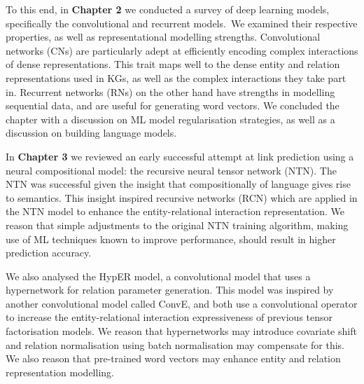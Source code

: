\noindent To this end, in \textbf{Chapter 2} we conducted a survey of deep learning models, specifically the convolutional and recurrent models.\ We examined their respective properties, as well as representational modelling strengths. Convolutional networks (CNs) are particularly adept at efficiently encoding complex interactions of dense representations. This trait maps well to the dense entity and relation representations used in KGs, as well as the complex interactions they take part in. Recurrent networks (RNs) on the other hand have strengths in modelling sequential data, and are useful for generating word vectors. We concluded the chapter with a discussion on ML model regularisation strategies, as well as a discussion on building language models. \par

\noindent In \textbf{Chapter 3} we reviewed an early successful attempt at link prediction using a neural compositional model: the recursive neural tensor network (NTN). The NTN was successful given the insight that compositionally of language gives rise to semantics. This insight inspired recursive networks (RCN) which are applied in the NTN model to enhance the entity-relational interaction representation. We reason that simple adjustments to the original NTN training algorithm, making use of ML techniques known to improve performance, should result in higher prediction accuracy. \par 

\noindent We also analysed the HypER model, a convolutional model that uses a hypernetwork for relation parameter generation. This model was inspired by another convolutional model called ConvE, and both use a convolutional operator to increase the entity-relational interaction expressiveness of previous tensor factorisation models. We reason that hypernetworks may introduce covariate shift and relation normalisation using batch normalisation may compensate for this. We also reason that pre-trained word vectors may enhance entity and relation representation modelling. \par

